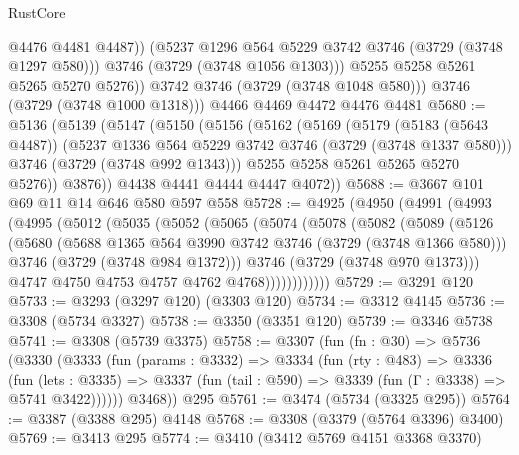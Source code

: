 \begin{lexlean}{RustCore}
\begin{coremodule}
                  @4476
                  @4481
                  @4487))
              (@5237 @1296 @564 @5229 @3742 @3746 (@3729 (@3748 @1297 @580)))
              @3746
              (@3729 (@3748 @1056 @1303)))
            @5255
            @5258
            @5261
            @5265
            @5270
            @5276))
        @3742
        @3746
        (@3729 (@3748 @1048 @580)))
      @3746
      (@3729 (@3748 @1000 @1318)))
    @4466
    @4469
    @4472
    @4476
    @4481
@5680 := @5136
    (@5139
      (@5147
        (@5150
          (@5156
            (@5162
              (@5169
                (@5179
                  (@5183 (@5643 @4487))
                  (@5237 @1336 @564 @5229 @3742 @3746 (@3729 (@3748 @1337 @580)))
                  @3746
                  (@3729 (@3748 @992 @1343)))
                @5255
                @5258
                @5261
                @5265
                @5270
                @5276))
            @3876))
        @4438
        @4441
        @4444
        @4447
        @4072))
@5688 := @3667 @101 @69 @11 @14 @646 @580 @597 @558
@5728 := @4925
    (@4950
      (@4991
        (@4993
          (@4995
            (@5012
              (@5035
                (@5052
                  (@5065
                    (@5074
                      (@5078
                        (@5082
                          (@5089
                            (@5126
                              (@5680
                                (@5688 @1365 @564 @3990 @3742 @3746 (@3729 (@3748 @1366 @580)))
                                @3746
                                (@3729 (@3748 @984 @1372)))
                              @3746
                              (@3729 (@3748 @970 @1373)))
                            @4747
                            @4750
                            @4753
                            @4757
                            @4762
                            @4768))))))))))))
@5729 := @3291 @120
@5733 := @3293 (@3297 @120) (@3303 @120)
@5734 := @3312 @4145
@5736 := @3308 (@5734 @3327)
@5738 := @3350 (@3351 @120)
@5739 := @3346 @5738
@5741 := @3308 (@5739 @3375)
@5758 := @3307
    (fun (fn : @30) =>
    @5736
      (@3330
        (@3333
          (fun (params : @3332) =>
          @3334
            (fun (rty : @483) =>
            @3336
              (fun (lets : @3335) =>
              @3337 (fun (tail : @590) => @3339 (fun (Γ : @3338) => @5741 @3422))))))
        @3468))
    @295
@5761 := @3474 (@5734 (@3325 @295))
@5764 := @3387 (@3388 @295) @4148
@5768 := @3308 (@3379 (@5764 @3396) @3400)
@5769 := @3413 @295
@5774 := @3410 (@3412 @5769 @4151 @3368 @3370)

\end{coremodule}
\end{lexlean}
